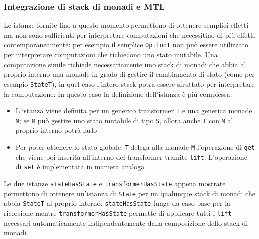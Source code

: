\subsubsection{Integrazione di stack di monadi e MTL}
Le istanze fornite fino a questo momento permettono di ottenere semplici effetti ma non sono sufficienti per interpretare computazioni che necessitino di più effetti contemporaneamente: per esempio il semplice \lstinline{OptionT} non può essere utilizzato per interpretare computazioni che richiedono uno stato mutabile.
Una computazione simile richiede necessariamente uno stack di monadi che abbia al proprio interno una monade in grado di gestire il cambiamento di stato (come per esempio \lstinline{StateT}), in quel caso l'intero stack potrà essere sfruttato per interpretare la computazione:
In questo caso la definizione dell'istanza è più complessa:
\begin{itemize}
  \item L'istanza viene definita per un generico transformer \lstinline{T} e una generica monade \lstinline{M}; se \lstinline{M} può gestire uno stato mutabile di tipo \lstinline{S}, allora anche \lstinline{T} con \lstinline{M} al proprio interno potrà farlo
  \item Per poter ottenere lo stato globale, \lstinline{T} delega alla monade \lstinline{M} l'operazione di \lstinline{get} che viene poi inserita all'interno del transformer tramite \lstinline{lift}. L'operazione di \lstinline{set} è implementata in maniera analoga
\end{itemize}

Le due istanze \lstinline{stateHasState} e \lstinline{transformerHasState} appena mostrate permettono di ottenere un'istanza di \lstinline{State} per un qualunque stack di monadi che abbia \lstinline{StateT} al proprio interno: \lstinline{stateHasState} funge da caso base per la ricorsione mentre \lstinline{transformerHasState} permette di applicare tutti i \lstinline{lift} necessari automaticamente indipendentemente dalla composizione dello stack di monadi.

